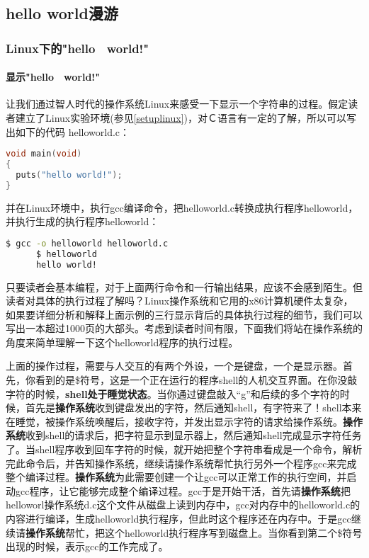 \subsection{hello world漫游}

\subsubsection{Linux下的"hello　world!"}

\paragraph{显示"hello　world!"}
让我们通过智人时代的操作系统Linux来感受一下显示一个字符串的过程。假定读者建立了Linux实验环境(参见\ref{setuplinux})，对Ｃ语言有一定的了解，所以可以写出如下的代码 helloworld.c：
\begin{lstlisting}[language={C}]
void main(void)
{
  puts("hello world!");
}
\end{lstlisting}

并在Linux环境中，执行gcc编译命令，把helloworld.c转换成执行程序helloworld，并执行生成的执行程序helloworld：



\begin{lstlisting}[language={bash}]
	  $ gcc -o helloworld helloworld.c
	  $ helloworld
	  hello world!
\end{lstlisting}

只要读者会基本编程，对于上面两行命令和一行输出结果，应该不会感到陌生。但读者对具体的执行过程了解吗？Linux操作系统和它用的x86计算机硬件太复杂，如果要详细分析和解释上面示例的三行显示背后的具体执行过程的细节，我们可以写出一本超过1000页的大部头。考虑到读者时间有限，下面我们将站在操作系统的角度来简单理解一下这个helloworld程序的执行过程。

上面的操作过程，需要与人交互的有两个外设，一个是键盘，一个是显示器。首先，你看到的是\$符号，这是一个正在运行的程序shell的人机交互界面。在你没敲字符的时候，\textbf{shell处于睡觉状态}。当你通过键盘敲入“g”和后续的多个字符的时候，首先是\textbf{操作系统}收到键盘发出的字符，然后通知shell，有字符来了！shell本来在睡觉，被操作系统唤醒后，接收字符，并发出显示字符的请求给操作系统。\textbf{操作系统}收到shell的请求后，把字符显示到显示器上，然后通知shell完成显示字符任务了。当shell程序收到回车字符的时候，就开始把整个字符串看成是一个命令，解析完此命令后，并告知操作系统，继续请操作系统帮忙执行另外一个程序gcc来完成整个编译过程。\textbf{操作系统}为此需要创建一个让gcc可以正常工作的执行空间，并启动gcc程序，让它能够完成整个编译过程。gcc于是开始干活，首先请\textbf{操作系统}把helloworl操作系统d.c这个文件从磁盘上读到内存中，gcc对内存中的helloworld.c的内容进行编译，生成helloworld执行程序，但此时这个程序还在内存中。于是gcc继续请\textbf{操作系统}帮忙，把这个helloworld执行程序写到磁盘上。当你看到第二个\$符号出现的时候，表示gcc的工作完成了。

